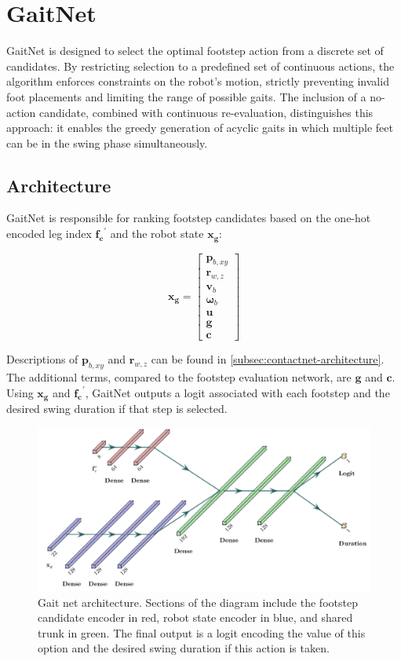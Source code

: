 \section{GaitNet}
\label{sec:gaitnet}

GaitNet is designed to select the optimal footstep action from a
discrete set of candidates. By restricting selection to a predefined
set of continuous actions, the algorithm enforces constraints on the
robot's motion, strictly preventing invalid foot placements and
limiting the range of possible gaits. The inclusion of a no-action
candidate, combined with continuous re-evaluation, distinguishes this
approach: it enables the greedy generation of acyclic gaits in which
multiple feet can be in the swing phase simultaneously.

\subsection{Architecture}
\label{subsec:contactnet-architecture}

GaitNet is responsible for ranking footstep candidates based on the
one-hot encoded leg index $\mathbf{f_c}^{\prime}$ and the robot state
$\mathbf{x_g}$:

\[
  \mathbf{x_g} =
  \begin{bmatrix}
    \mathbf p_{b,xy} \\
    \mathbf r_{w,z} \\
    \mathbf v_b \\
    \mathbf \omega_b \\
    \mathbf u \\
    \mathbf g \\
    \mathbf c
  \end{bmatrix}
\]

Descriptions of $\mathbf p_{b,xy}$ and $\mathbf r_{w,z}$ can be found
in \autoref{subsec:contactnet-architecture}. The additional terms,
compared to the footstep evaluation network, are $\mathbf g$ and
$\mathbf c$. Using $\mathbf{x_g}$ and $\mathbf{f_c}^{\prime}$,
GaitNet outputs a logit associated with each footstep and the desired
swing duration if that step is selected.

\begin{figure}[H]
  \centering
  \includegraphics[width=0.625\linewidth]{images/diagrams/gait-network-architecture.png}
  \caption{Gait net architecture. Sections of the diagram include the
    footstep candidate encoder in red,     robot state encoder in blue,
    and shared trunk in green.     The final output is a logit encoding
    the value of this option and the   desired swing duration if this
  action is taken.}
  \label{fig:diagram-gaitnet-architecture}
\end{figure}

